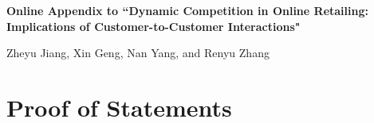 \documentclass[nonblindrev,copyedit]{informs1}
\begin{document}

\setcounter{page}{1}

\begin{APPENDICES}

\begin{center}
{\large\bfseries Online Appendix to ``Dynamic Competition in Online Retailing: Implications of Customer-to-Customer Interactions"\par}
Zheyu Jiang, Xin Geng, Nan Yang, and Renyu Zhang
\end{center}

\section{Proof of Statements} \label{appdx-proof}


\end{APPENDICES}
\end{document}
